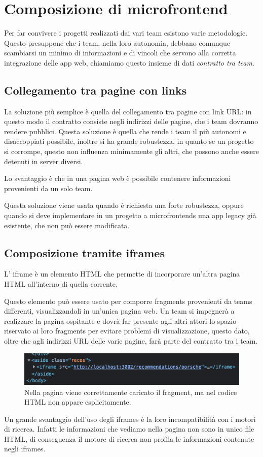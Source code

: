 \chapter{Composizione di microfrontend}\label{ch:composizione}
Per far convivere i progetti realizzati dai vari team esistono varie metodologie. Questo
 presuppone che i team, nella loro autonomia, debbano comunque scambiarsi un minimo di informazioni e di vincoli
che servono alla corretta integrazione delle app web, chiamiamo questo insieme di dati \emph{contratto tra team}.

\section{Collegamento tra pagine con links}
La soluzione più semplice è quella del collegamento tra pagine con link URL: in questo modo il contratto consiste negli indirizzi delle pagine,
che i team dovranno rendere pubblici.
Questa soluzione è quella che rende i team il più autonomi e disaccoppiati possibile, inoltre
si ha grande robustezza, in quanto se un progetto si corrompe, questo non influenza minimamente gli altri,
che possono anche essere detenuti in server diversi.

Lo svantaggio è che in una pagina web è possibile contenere informazioni provenienti da un solo team.

Questa soluzione viene usata quando è richiesta una forte robustezza, oppure quando si deve implementare 
in un progetto a microfrontends una app legacy già esistente, che non può essere modificata.


\section{Composizione tramite iframes}
L' iframe è un elemento HTML che permette di incorporare un'altra pagina HTML all'interno di quella corrente. \cite{mozillaiframe}

Questo elemento può essere usato per comporre fragments provenienti da teams differenti, visualizzandoli in un'unica
pagina web.
Un team si impegnerà a realizzare la pagina ospitante e dovrà far presente agli altri attori lo spazio riservato
ai loro fragments per evitare problemi di visualizzazione, questo dato, oltre che agli indirizzi
URL delle varie pagine, farà parte del contratto tra i team.

\begin{figure}[H]
    \centering
    \includegraphics[width=140mm]{img/iframes}
    \caption{Nella pagina viene correttamente caricato il fragment, ma nel codice HTML non appare esplicitamente.}
  \end{figure}
Un grande svantaggio dell’uso degli iframes è la loro incompatibilità con i motori di ricerca.
Infatti le informazioni che vediamo nella pagina non sono in unico file HTML, di conseguenza il motore di ricerca non profila le informazioni 
contenute negli iframes.

